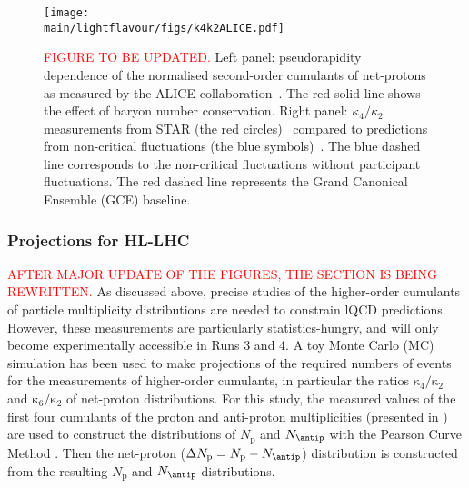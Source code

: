 \begin{figure}[h]
\begin{center}
\texttt{[image: \\main/lightflavour/figs/k4k2ALICE.pdf]}
\end{center}
\caption{\textcolor{red}{FIGURE TO BE UPDATED.}
Left panel: pseudorapidity dependence of the normalised second-order cumulants of net-protons as measured by the ALICE collaboration~\cite{Rustamov:2017lio}. The red solid line shows the effect of baryon number conservation. Right panel: $\kappa_{4}/\kappa_{2}$ measurements from STAR (the red circles)~\cite{Luo:2015ewa} compared to predictions from non-critical fluctuations (the blue symbols)~\cite{Braun-Munzinger:2018yru}. The blue dashed line corresponds to the non-critical fluctuations without participant fluctuations. The red dashed line represents the Grand Canonical Ensemble (GCE) baseline.}  
\label{netpALICE_STAR}
\end{figure}


\subsubsection{Projections for HL-LHC}
\textcolor{red}{AFTER MAJOR UPDATE OF THE FIGURES, THE SECTION IS BEING REWRITTEN.}
As discussed above, precise studies of the higher-order cumulants of particle multiplicity distributions are needed to constrain lQCD predictions. However, these measurements are particularly statistics-hungry, and will only become experimentally accessible in Runs 3 and 4. A toy Monte Carlo (MC) simulation has been used to make projections of the required numbers of events for the measurements of higher-order cumulants, in particular the ratios $\mathrm{\kappa}_{4}/\mathrm{\kappa}_{2}$ and $\mathrm{\kappa}_{6}/\mathrm{\kappa}_{2}$ of net-proton distributions.  For this study, the measured values of the first four cumulants of the proton and anti-proton multiplicities (presented in \cite{Behera:2018wqk}) are used to construct the distributions of $N_{\mathrm{p}}$ and $N_{\antip}$ with the Pearson Curve Method \cite{Behera:2017xwg}. Then the net-proton ($\Delta N_{\mathrm{p}} = N_{\mathrm{p}}-N_{\antip}$) distribution is constructed from the resulting $N_{\mathrm{p}}$ and $N_{\antip}$ distributions. 

